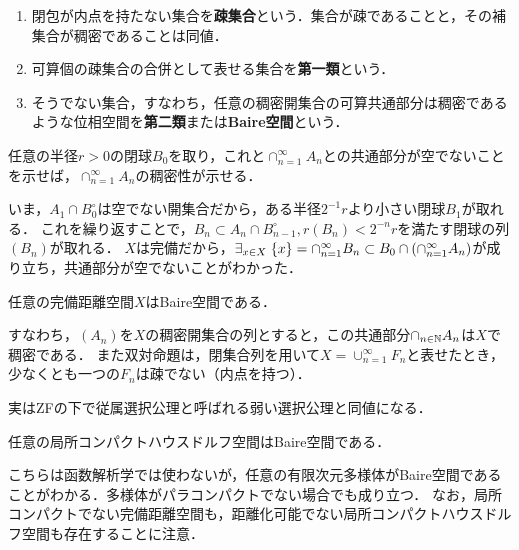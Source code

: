 \documentclass[uplatex,dvipdfmx]{jsreport}
\begin{document}
\begin{definition}\mbox{}
    \begin{enumerate}
        \item 閉包が内点を持たない集合を\textbf{疎集合}という．集合が疎であることと，その補集合が稠密であることは同値．
        \item 可算個の疎集合の合併として表せる集合を\textbf{第一類}という．
        \item そうでない集合，すなわち，任意の稠密開集合の可算共通部分は稠密であるような位相空間を\textbf{第二類}または\textbf{Baire空間}という．
    \end{enumerate}
\end{definition}
\begin{Proof}
    任意の半径$r>0$の閉球$B_0$を取り，これと$\cap_{n=1}^\infty A_n$との共通部分が空でないことを示せば，$\cap_{n=1}^\infty A_n$の稠密性が示せる．

    いま，$A_1\cap B_0^\circ$は空でない開集合だから，ある半径$2^{-1}r$より小さい閉球$B_1$が取れる．
    これを繰り返すことで，$B_n\subset A_n\cap B^\circ_{n-1},r(B_n)<2^{-n}r$を満たす閉球の列$(B_n)$が取れる．
    $X$は完備だから，$\exists_{x\in X}\;\{x\}=\cap_{n=1}^\infty B_n\subset B_0\cap\left(\cap_{n=1}^\infty A_n\right)$が成り立ち，共通部分が空でないことがわかった．
\end{Proof}

\begin{proposition}
    任意の完備距離空間$X$はBaire空間である．
    
    すなわち，$(A_n)$を$X$の稠密開集合の列とすると，この共通部分$\cap_{n\in\mathbb{N}}A_n$は$X$で稠密である．
    また双対命題は，閉集合列を用いて$X=\cup_{n=1}^\infty F_n$と表せたとき，少なくとも一つの$F_n$は疎でない（内点を持つ）．
\end{proposition}
\begin{remark}
    実はZFの下で従属選択公理と呼ばれる弱い選択公理と同値になる．
\end{remark}

\begin{proposition}[BCT2]
    任意の局所コンパクトハウスドルフ空間はBaire空間である．
\end{proposition}
\begin{remarks}
    こちらは函数解析学では使わないが，任意の有限次元多様体がBaire空間であることがわかる．多様体がパラコンパクトでない場合でも成り立つ．
    なお，局所コンパクトでない完備距離空間も，距離化可能でない局所コンパクトハウスドルフ空間も存在することに注意．
\end{remarks}
\end{document}
